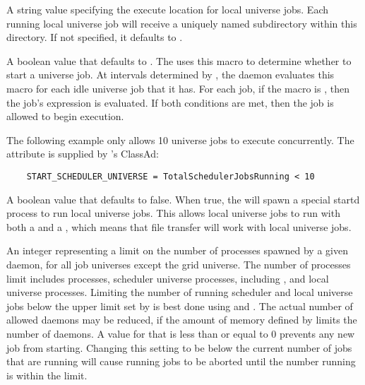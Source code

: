 \begin{description}
\label{param:LocalUnivExecute}
\item[\Macro{LOCAL\_UNIV\_EXECUTE}]
  A string value specifying the execute location for local
  universe jobs.  Each running local universe job will receive a
  uniquely named subdirectory within this directory.
  If not specified, it defaults to .

\label{param:StartSchedulerUniverse}
\item[\Macro{START\_SCHEDULER\_UNIVERSE}]
  A boolean value that defaults to .
  The  uses this macro to determine whether to start
  a  universe job. 
  At intervals determined by , 
  the  daemon evaluates this macro
  for each idle  universe job that it has.
  For each job, if the  
  macro is , then the job's  expression
  is evaluated. If both conditions are met, then the job is allowed
  to begin execution. 
  
  The following example only allows 10  universe jobs to
  execute concurrently. The attribute 
  is supplied by 's ClassAd:
  
  \footnotesize
  \begin{verbatim}
    START_SCHEDULER_UNIVERSE = TotalSchedulerJobsRunning < 10
  \end{verbatim}
  \normalsize
  
  
\label{param:ScheddUsesStartdforLocalUniverse}
\item[\Macro{SCHEDD\_USES\_STARTD\_FOR\_LOCAL\_UNIVERSE}]
 A boolean value that defaults to false.  When true, the 
 will spawn a special startd process to run local universe jobs.  This
 allows local universe jobs to run with both a  and a
 , which means that file transfer will work with local
 universe jobs.

\label{param:MaxJobsRunning}
\item[\Macro{MAX\_JOBS\_RUNNING}]
  An integer representing a limit on the number of processes
  spawned by a given  daemon,
  for all job universes except the grid universe. 
  The number of processes limit includes  processes,
  scheduler universe processes, including , and
  local universe  processes.
  Limiting the number of running scheduler and local universe
  jobs below the upper limit set by  is best
  done using  and
  .
  The actual number of allowed  daemons may be reduced,
  if the amount of memory defined by  limits the
  number of  daemons.
  A value for  that is less than or equal to 0
  prevents any new job from starting.  Changing this setting to be below
  the current number of jobs that are running will cause running jobs to
  be aborted until the number running is within the limit.


\end{description}
